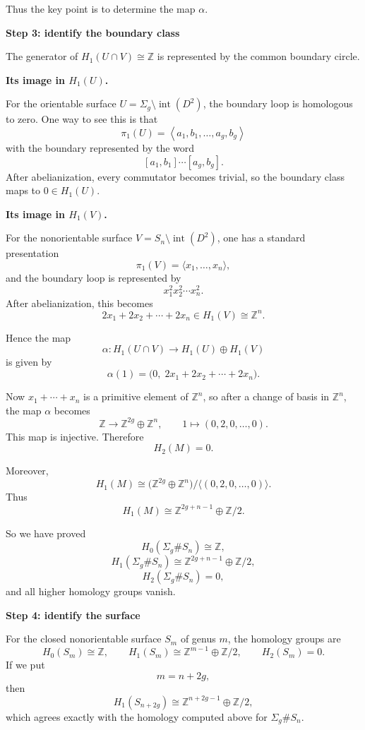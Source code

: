 \begin{solution}
Thus the key point is to determine the map \(\alpha\).


\medskip
\noindent\textbf{Step 3: identify the boundary class}\par
\smallskip

The generator of \(H_1(U\cap V)\cong \mathbb Z\) is represented by the common boundary circle.


\medskip
\noindent\textbf{Its image in \(H_1(U)\).}\par
\smallskip

For the orientable surface \(U=\Sigma_g\setminus \operatorname{int}(D^2)\), the boundary loop is homologous to zero. One way to see this is that
\[
\pi_1(U)=
\left\langle
a_1,b_1,\dots,a_g,b_g
\right\rangle
\]
with the boundary represented by the word
\[
[a_1,b_1]\cdots [a_g,b_g].
\]
After abelianization, every commutator becomes trivial, so the boundary class maps to \(0\in H_1(U)\).


\medskip
\noindent\textbf{Its image in \(H_1(V)\).}\par
\smallskip

For the nonorientable surface \(V=S_n\setminus \operatorname{int}(D^2)\), one has a standard presentation
\[
\pi_1(V)=\langle x_1,\dots,x_n\rangle,
\]
and the boundary loop is represented by
\[
x_1^2x_2^2\cdots x_n^2.
\]
After abelianization, this becomes
\[
2x_1+2x_2+\cdots+2x_n
\in H_1(V)\cong \mathbb Z^n.
\]

Hence the map
\[
\alpha:H_1(U\cap V)\to H_1(U)\oplus H_1(V)
\]
is given by
\[
\alpha(1)=\bigl(0,\;2x_1+2x_2+\cdots+2x_n\bigr).
\]

Now \(x_1+\cdots+x_n\) is a primitive element of \(\mathbb Z^n\), so after a change of basis in \(\mathbb Z^n\), the map \(\alpha\) becomes
\[
\mathbb Z\to \mathbb Z^{2g}\oplus \mathbb Z^n,
\qquad
1\mapsto (0,2,0,\dots,0).
\]
This map is injective. Therefore
\[
H_2(M)=0.
\]

Moreover,
\[
H_1(M)\cong
\bigl(\mathbb Z^{2g}\oplus \mathbb Z^n\bigr)\big/\langle (0,2,0,\dots,0)\rangle.
\]
Thus
\[
H_1(M)\cong \mathbb Z^{2g+n-1}\oplus \mathbb Z/2.
\]

So we have proved
\[
H_0(\Sigma_g\# S_n)\cong \mathbb Z,
\]
\[
H_1(\Sigma_g\# S_n)\cong \mathbb Z^{2g+n-1}\oplus \mathbb Z/2,
\]
\[
H_2(\Sigma_g\# S_n)=0,
\]
and all higher homology groups vanish.


\medskip
\noindent\textbf{Step 4: identify the surface}\par
\smallskip

For the closed nonorientable surface \(S_m\) of genus \(m\), the homology groups are
\[
H_0(S_m)\cong \mathbb Z,
\qquad
H_1(S_m)\cong \mathbb Z^{m-1}\oplus \mathbb Z/2,
\qquad
H_2(S_m)=0.
\]
If we put
\[
m=n+2g,
\]
then
\[
H_1(S_{n+2g})\cong \mathbb Z^{n+2g-1}\oplus \mathbb Z/2,
\]
which agrees exactly with the homology computed above for \(\Sigma_g\# S_n\).


\end{solution}
